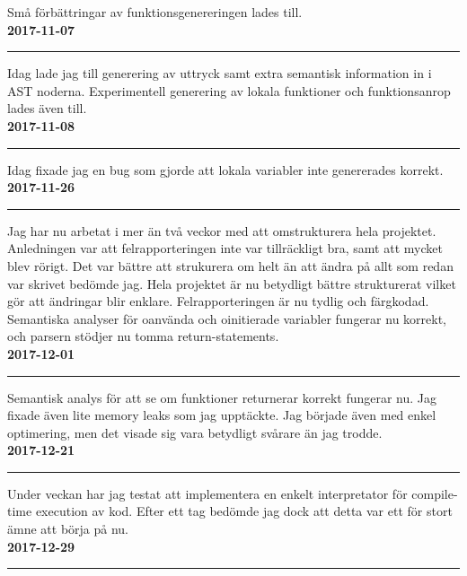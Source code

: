 \documentclass{theme}
\begin{document}
\noindent 
Små förbättringar av funktionsgenereringen lades till.\\

\noindent\textbf{2017-11-07}\\
\noindent\rule{\textwidth}{1pt}

\noindent 
Idag lade jag till generering av uttryck samt extra semantisk information in i 
AST noderna. Experimentell generering av lokala funktioner och funktionsanrop 
lades även till. \\

\noindent\textbf{2017-11-08}\\
\noindent\rule{\textwidth}{1pt}

\noindent 
Idag fixade jag en bug som gjorde att lokala variabler inte genererades korrekt.
\\

\noindent\textbf{2017-11-26}\\
\noindent\rule{\textwidth}{1pt}

\noindent 
Jag har nu arbetat i mer än två veckor med att omstrukturera hela 
projektet.  Anledningen var att felrapporteringen inte var tillräckligt bra, 
samt att mycket blev rörigt. Det var bättre att strukurera om helt än att ändra 
på allt som redan var skrivet bedömde jag. Hela projektet är nu betydligt bättre
strukturerat vilket gör att ändringar blir enklare. Felrapporteringen är nu 
tydlig och färgkodad. Semantiska analyser för oanvända och oinitierade variabler
fungerar nu korrekt, och parsern stödjer nu tomma return-statements. \\

\noindent\textbf{2017-12-01}\\
\noindent\rule{\textwidth}{1pt}

\noindent 
Semantisk analys för att se om funktioner returnerar korrekt fungerar nu. Jag 
fixade även lite memory leaks som jag upptäckte. Jag började även med 
enkel optimering, men det visade sig vara betydligt svårare än jag trodde.\\

\noindent\textbf{2017-12-21}\\
\noindent\rule{\textwidth}{1pt}

\noindent 
Under veckan har jag testat att implementera en enkelt interpretator för 
compile-time execution av kod. Efter ett tag bedömde jag dock att detta var
ett för stort ämne att börja på nu. \\

\noindent\textbf{2017-12-29}\\
\noindent\rule{\textwidth}{1pt}
\end{document}
